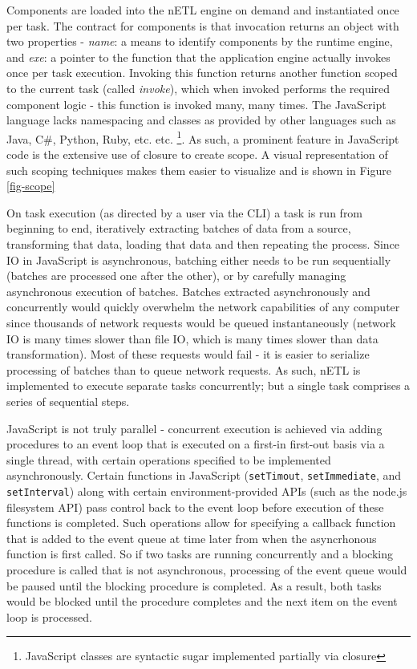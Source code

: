 Components are loaded into the nETL engine on demand and instantiated once per task. The contract for components is that invocation returns an object with two properties - \textit{name}: a means to identify components by the runtime engine, and \textit{exe}: a pointer to the function that the application engine actually invokes once per task execution. Invoking this function returns another function scoped to the current task (called \textit{invoke}), which when invoked performs the required component logic - this function is invoked many, many times. The JavaScript language lacks namespacing and classes as provided by other languages such as Java, C\#, Python, Ruby, etc. etc. \footnote{JavaScript classes are syntactic sugar implemented partially via closure}. As such, a prominent feature in JavaScript code is the extensive use of closure to create scope. A visual representation of such scoping techniques makes them easier to visualize and is shown in Figure \ref{fig-scope}



On task execution (as directed by a user via the CLI) a task is run from beginning to end, iteratively extracting batches of data from a source, transforming that data, loading that data and then repeating the process. Since IO in JavaScript is asynchronous, batching either needs to be run sequentially (batches are processed one after the other), or by carefully managing asynchronous execution of batches. Batches extracted asynchronously and concurrently would quickly overwhelm the network capabilities of any computer since thousands of network requests would be queued instantaneously (network IO is many times slower than file IO, which is many times slower than data transformation). Most of these requests would fail - it is easier to serialize processing of batches than to queue network requests. As such, nETL is implemented to execute separate tasks concurrently; but a single task comprises a series of sequential steps.

JavaScript is not truly parallel - concurrent execution is achieved via adding procedures to an event loop that is executed on a first-in first-out basis via a single thread, with certain operations specified to be implemented asynchronously. Certain functions in JavaScript (\texttt{setTimout}, \texttt{setImmediate}, and \texttt{setInterval}) along with certain environment-provided APIs (such as the node.js filesystem API) pass control back to the event loop before execution of these functions is completed. Such operations allow for specifying a callback function that is added to the event queue at time later from when the asyncrhonous function is first called. So if two tasks are running concurrently and a blocking procedure is called that is not asynchronous, processing of the event queue would be paused until the blocking procedure is completed. As a result, both tasks would be blocked until the procedure completes and the next item on the event loop is processed.

